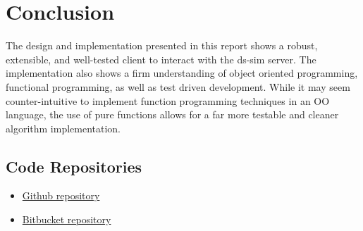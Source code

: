 \documentclass[a4paper]{article} %
\begin{document}
\section*{Conclusion}
The design and implementation presented in this report shows a robust, extensible, and well-tested client to interact with the ds-sim server. 
The implementation also shows a firm understanding of object oriented programming, functional programming, as well as test driven development.
While it may seem counter-intuitive to implement function programming techniques in an OO language, the use of pure functions allows for a far more testable and cleaner algorithm implementation.


\subsection*{Code Repositories}
\begin{itemize}
    \item \hyperlink{https://github.com/jamesnuge/comp3100-assignment1}{Github repository}
    \item \hyperlink{https://bitbucket.org/jamesnuge/assignment-1}{Bitbucket repository}
\end{itemize}




\end{document}
